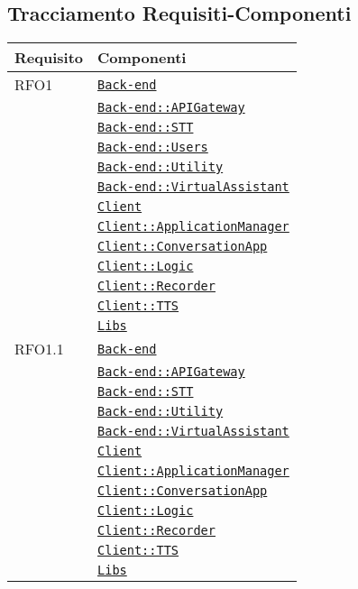 \subsection{Tracciamento Requisiti-Componenti}
\normalsize
\begin{longtable}{|>{\centering}m{3cm}|m{10cm}<{\centering}|}
\hline 
\textbf{Requisito} & \textbf{Componenti}\\
\hline
\endhead
RFO1 & \hyperref[Back-end]{\texttt{Back-end}}\\
& \hyperref[Back-end::APIGateway]{\texttt{Back-end::APIGateway}}\\
& \hyperref[Back-end::STT]{\texttt{Back-end::STT}}\\
& \hyperref[Back-end::Users]{\texttt{Back-end::Users}}\\
& \hyperref[Back-end::Utility]{\texttt{Back-end::Utility}}\\
& \hyperref[Back-end::VirtualAssistant]{\texttt{Back-end::VirtualAssistant}}\\
& \hyperref[Client]{\texttt{Client}}\\
& \hyperref[Client::ApplicationManager]{\texttt{Client::ApplicationManager}}\\
& \hyperref[Client::ConversationApp]{\texttt{Client::ConversationApp}}\\
& \hyperref[Client::Logic]{\texttt{Client::Logic}}\\
& \hyperref[Client::Recorder]{\texttt{Client::Recorder}}\\
& \hyperref[Client::TTS]{\texttt{Client::TTS}}\\
& \hyperref[Libs]{\texttt{Libs}}\\ \hline

RFO1.1 & \hyperref[Back-end]{\texttt{Back-end}}\\
& \hyperref[Back-end::APIGateway]{\texttt{Back-end::APIGateway}}\\
& \hyperref[Back-end::STT]{\texttt{Back-end::STT}}\\
& \hyperref[Back-end::Utility]{\texttt{Back-end::Utility}}\\
& \hyperref[Back-end::VirtualAssistant]{\texttt{Back-end::VirtualAssistant}}\\
& \hyperref[Client]{\texttt{Client}}\\
& \hyperref[Client::ApplicationManager]{\texttt{Client::ApplicationManager}}\\
& \hyperref[Client::ConversationApp]{\texttt{Client::ConversationApp}}\\
& \hyperref[Client::Logic]{\texttt{Client::Logic}}\\
& \hyperref[Client::Recorder]{\texttt{Client::Recorder}}\\
& \hyperref[Client::TTS]{\texttt{Client::TTS}}\\
& \hyperref[Libs]{\texttt{Libs}}\\ \hline


\end{longtable}
